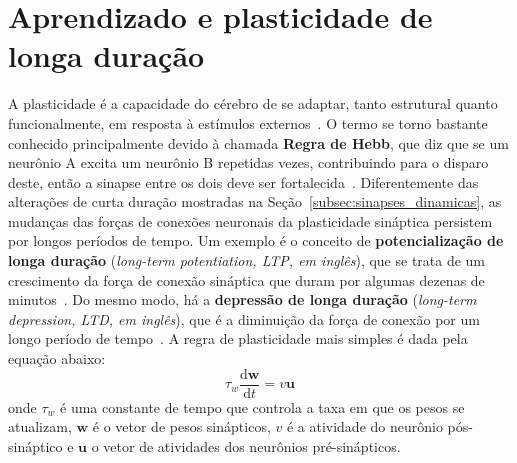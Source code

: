 \section{Aprendizado e plasticidade de longa duração}\label{sec:aprendizado}

A plasticidade é a capacidade do cérebro de se adaptar, tanto estrutural quanto funcionalmente, em resposta à estímulos externos~\cite{mateos-aparicio_impact_2019}. O termo se torno bastante conhecido principalmente devido à chamada \textbf{Regra de Hebb}, que diz que se um neurônio A excita um neurônio B repetidas vezes, contribuindo para o disparo deste, então a sinapse entre os dois deve ser fortalecida~\cite{hebb_organization_2005}. Diferentemente das alterações de curta duração mostradas na Seção~\ref{subsec:sinapses_dinamicas}, as mudanças das forças de conexões neuronais da plasticidade sináptica persistem por longos períodos de tempo. Um exemplo é o conceito de \textbf{potencialização de longa duração} (\textit{long-term potentiation, LTP, em inglês}), que se trata de um crescimento da força de conexão sináptica que duram por algumas dezenas de minutos~\cite{bliss_longlasting_1973}. Do mesmo modo, há a \textbf{depressão de longa duração} (\textit{long-term depression, LTD, em inglês}), que é a diminuição da força de conexão por um longo período de tempo~\cite{bear_long-term_1996}. A regra de plasticidade mais simples é dada pela equação abaixo:
\begin{equation}\label{eq:regra_hebb}
	\tau_w\dfrac{\mathrm{d}\mathbf{w}}{\mathrm{d}t}=v\mathbf{u}
\end{equation}
onde $\tau_w$ é uma constante de tempo que controla a taxa em que os pesos se atualizam, $\mathbf{w}$ é o vetor de pesos sinápticos, $v$ é a atividade do neurônio pós-sináptico e $\mathbf{u}$ o vetor de atividades dos neurônios pré-sinápticos.

